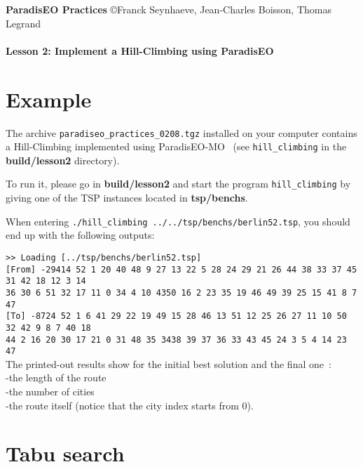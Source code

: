 \documentclass[a4paper]{article}
\begin{document}
\textbf{ParadisEO Practices}  {\copyright Franck Seynhaeve,
Jean-Charles Boisson, Thomas Legrand} \Large{\textbf{\\\\
Lesson 2: Implement a Hill-Climbing using ParadisEO}}

\normalsize

\vspace{-0,3cm}

\section{Example}

    The archive {\tt paradiseo\_practices\_0208.tgz} installed
    on your computer contains a Hill-Climbing implemented using ParadisEO-MO~
    (see {\tt hill\_climbing} in the {\bf build/lesson2} directory).

    \medskip
    To run it, please go in {\bf build/lesson2} and start the program {\tt hill\_climbing} by giving
    one of the TSP instances located in {\bf tsp/benchs}.


    \medskip
    When entering {\tt ./hill\_climbing ../../tsp/benchs/berlin52.tsp}, you should end up with the
    following outputs:

    \smallskip
    \noindent
    \texttt{>> Loading [../tsp/benchs/berlin52.tsp]}\\
    \texttt{[From] -29414  52 1 20 40 48 9 27 13 22 5 28 24 29 21 26 44 38 33 37 45 31 42 18 12 3 14}\\
    \texttt{36 30 6 51 32 17 11 0 34 4 10 4350 16 2 23 35 19 46 49 39 25 15 41 8 7 47}\\
    \texttt{[To] -8724  52 1 6 41 29 22 19 49 15 28 46 13 51 12 25 26 27 11 10 50 32 42 9 8 7 40 18}\\
    \texttt{44 2 16 20 30 17 21 0 31 48 35 3438 39 37 36 33 43 45 24 3 5 4 14 23
    47} \\

    The printed-out results show for the initial best solution and the final one~:
    \\ \hspace*{1cm}-the length of the route
    \\ \hspace*{1cm}-the number of cities
    \\ \hspace*{1cm}-the route itself (notice that the city index starts from 0).


\section{Tabu search}
\end{document}
